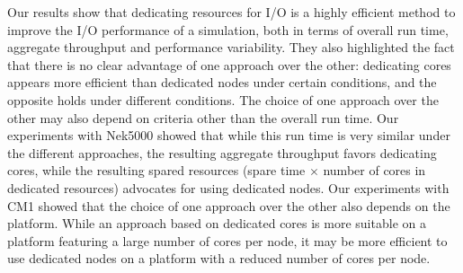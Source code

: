 Our results show that dedicating resources for I/O is a highly efficient method to improve the I/O performance
of a simulation, both in terms of overall run time, aggregate throughput and performance variability. 
They also highlighted the fact that there is no clear advantage of one approach over the other: 
dedicating cores appears more efficient than dedicated nodes under certain conditions, and the opposite holds 
under different conditions. The choice
of one approach over the other may also depend on criteria other than the overall run time. Our experiments
with Nek5000 showed that while this run time is very similar under the different approaches, the resulting
aggregate throughput favors dedicating cores, while the resulting spared resources (spare time $\times$ number 
of cores in dedicated resources) advocates for using dedicated nodes. Our experiments with CM1 showed that
the choice of one approach over the other also depends on the platform. While an approach based on dedicated cores is
more suitable on a platform featuring a large number of cores per node, it may be more efficient to use dedicated nodes
on a platform with a reduced number of cores per node.
